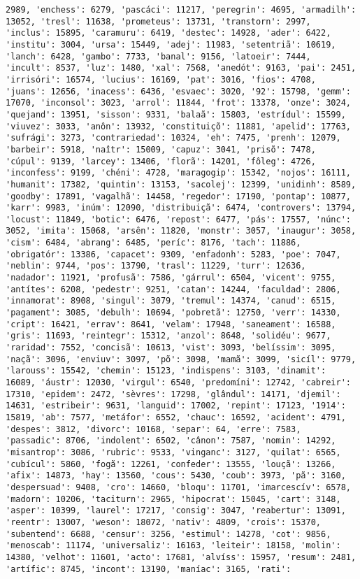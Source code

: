 \documentclass[11pt]{article}
\begin{document}
\begin{Verbatim}[commandchars=\\\{\}]
2989, 'enchess': 6279, 'pascáci': 11217, 'peregrin': 4695, 'armadilh': 13052, 'tresl': 11638, 'prometeus': 13731, 'transtorn': 2997, 'inclus': 15895, 'caramuru': 6419, 'destec': 14928, 'ader': 6422, 'institu': 3004, 'ursa': 15449, 'adej': 11983, 'setentriã': 10619, 'lanch': 6428, 'gambo': 7733, 'banal': 9156, 'latoeir': 7444, 'incult': 8537, 'luz': 1480, 'xal': 7568, 'anedót': 9163, 'pai': 2451, 'irrisóri': 16574, 'lucius': 16169, 'pat': 3016, 'fios': 4708, 'juans': 12656, 'inacess': 6436, 'esvaec': 3020, '92': 15798, 'gemm': 17070, 'inconsol': 3023, 'arrol': 11844, 'frot': 13378, 'onze': 3024, 'quejand': 13951, 'sisson': 9331, 'balaã': 15803, 'estrídul': 15599, 'viuvez': 3033, 'anôn': 13932, 'constituiçõ': 11881, 'apelid': 17763, 'sufrági': 3273, 'contrariedad': 10324, 'eh': 7475, 'prenh': 12079, 'barbeir': 5918, 'naîtr': 15009, 'capuz': 3041, 'prisõ': 7478, 'cúpul': 9139, 'larcey': 13406, 'florã': 14201, 'fôleg': 4726, 'inconfess': 9199, 'chéni': 4728, 'maragogip': 15342, 'nojos': 16111, 'humanit': 17382, 'quintin': 13153, 'sacolej': 12399, 'unidinh': 8589, 'goodby': 17891, 'vagalhã': 14458, 'regedor': 17190, 'pontap': 10877, 'karr': 9983, 'inúm': 12090, 'distribuiçã': 6474, 'controvers': 13794, 'locust': 11849, 'botic': 6476, 'repost': 6477, 'pás': 17557, 'núnc': 3052, 'imita': 15068, 'arsên': 11820, 'monstr': 3057, 'inaugur': 3058, 'cism': 6484, 'abrang': 6485, 'períc': 8176, 'tach': 11886, 'obrigatór': 13386, 'capacet': 9309, 'enfadonh': 5283, 'poe': 7047, 'neblin': 9744, 'pos': 13790, 'trasl': 11229, 'turr': 12636, 'nadador': 11921, 'profusã': 7586, 'gárrul': 6504, 'vicent': 9755, 'antítes': 6208, 'pedestr': 9251, 'catan': 14244, 'faculdad': 2806, 'innamorat': 8908, 'singul': 3079, 'tremul': 14374, 'canud': 6515, 'pagament': 3085, 'debulh': 10694, 'pobretã': 12750, 'verr': 14330, 'cript': 16421, 'errav': 8641, 'velam': 17948, 'saneament': 16588, 'gris': 11693, 'reintegr': 15312, 'anzol': 8648, 'solidéu': 9677, 'raridad': 7552, 'concisã': 10613, 'vist': 3093, 'belíssim': 3095, 'naçã': 3096, 'enviuv': 3097, 'põ': 3098, 'mamã': 3099, 'sicíl': 9779, 'larouss': 15542, 'chemin': 15123, 'indispens': 3103, 'dinamit': 16089, 'áustr': 12030, 'virgul': 6540, 'predomíni': 12742, 'cabreir': 17310, 'epidem': 2472, 'sèvres': 17298, 'glândul': 14171, 'djemil': 14631, 'estribeir': 9631, 'languid': 17002, 'repint': 17123, '1914': 15819, 'ab': 7577, 'metáfor': 6552, 'chauc': 16592, 'acident': 4791, 'despes': 3812, 'divorc': 10168, 'separ': 64, 'erre': 7583, 'passadic': 8706, 'indolent': 6502, 'cânon': 7587, 'nomin': 14292, 'misantrop': 3086, 'rubric': 9533, 'vinganc': 3127, 'quilat': 6565, 'cubícul': 5860, 'fogã': 12261, 'confeder': 13555, 'louçã': 13266, 'afix': 14873, 'hay': 13560, 'cous': 5430, 'coub': 3973, 'pã': 3160, 'despersuad': 9408, 'cro': 14660, 'bloqu': 11701, 'imarcescív': 6578, 'madorn': 10206, 'taciturn': 2965, 'hipocrat': 15045, 'cart': 3148, 'asper': 10399, 'laurel': 17217, 'consig': 3047, 'reabertur': 13091, 'reentr': 13007, 'weson': 18072, 'nativ': 4809, 'crois': 15370, 'subentend': 6688, 'censur': 3256, 'estimul': 14278, 'cot': 9856, 'menoscab': 11174, 'universaliz': 16163, 'leiteir': 18158, 'molin': 14380, 'velhot': 11601, 'acto': 17681, 'alvíss': 15957, 'resum': 2481, 'artífic': 8745, 'incont': 13190, 'maníac': 3165, 'rati': 
\end{Verbatim}
\end{document}
